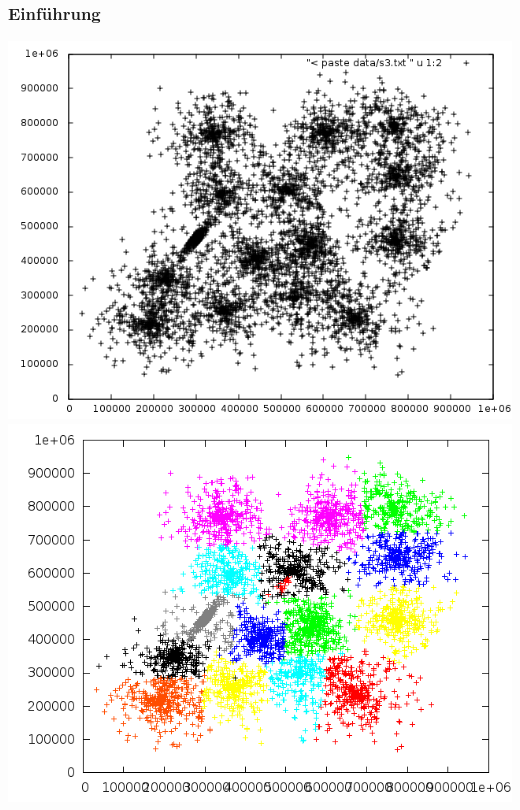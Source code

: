 \documentclass[10pt]{beamer}
\begin{document}
\begin{frame}
	\frametitle{Einf\"uhrung}
	\includegraphics[scale=0.34, keepaspectratio]{../output/pics/s3_black.png}
	\includegraphics[scale=0.34, keepaspectratio]{../output/pics/s3_colored.png}
\end{frame}
\end{document}
